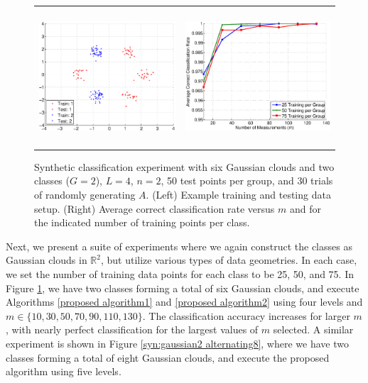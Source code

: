 \documentclass[twoside,11pt]{article}
\def \R {\mathbb{R}}
\newcommand{\edit}[1]{{{#1}}}
\begin{document}
\begin{figure}[!htbp]
\centering
\begin{tabular}{cc}
\includegraphics[height=2in]{images/Synthetic/6ball_g2_d2/synthetic_2a.eps} &
\includegraphics[height=2in]{images/Synthetic/6ball_g2_d2/synthetic_2b.eps} \\
\end{tabular}
\caption{Synthetic classification experiment with six Gaussian clouds and two classes ($G=2$), $L=4$, $n=2$, 50 test points per group, and 30 trials of randomly generating $A$. (Left) Example training and testing data setup. (Right) Average correct classification rate versus $m$ and for the indicated number of training points per class.}
\label{syn:gaussian2 alternating6}
\end{figure}

Next, we present a suite of experiments where we again construct the classes as Gaussian clouds in $\R^2$, but utilize \edit{various types of data geometries.} In each case,  we set the number of training data points for each class to be 25, 50, and 75. In Figure \ref{syn:gaussian2 alternating6}, we have two classes forming a total of six Gaussian clouds, and execute Algorithms \ref{proposed algorithm1} and \ref{proposed algorithm2} using four \edit{level}s and $m\in\{10,30,50,70,90,110,130\}$. The classification accuracy increases for larger $m$, with nearly perfect classification for the largest values of $m$ selected. 
 A similar experiment is shown in Figure \ref{syn:gaussian2 alternating8}, where we have two classes forming a total of eight Gaussian clouds, and execute the proposed algorithm using five \edit{level}s. 
\end{document}
